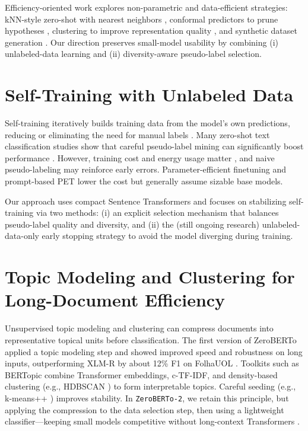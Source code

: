 \documentclass[]{politex-xico}
\begin{document}
Efficiency-oriented work explores non-parametric and data-efficient strategies: kNN-style zero-shot with nearest neighbors \cite{shi2022nearest,shi2022knnprompt}, conformal predictors to prune hypotheses \cite{choubey2022conformal}, clustering to improve representation quality \cite{fei2022beyond}, and synthetic dataset generation \cite{ye2022zerogen}. Our direction preserves small-model usability by combining (i) unlabeled-data learning and (ii) diversity-aware pseudo-label selection.

\section{Self-Training with Unlabeled Data}
\label{sec:self_training}

Self-training iteratively builds training data from the model’s own predictions, reducing or eliminating the need for manual labels \cite{Ando2005}. Many zero-shot text classification studies show that careful pseudo-label mining can significantly boost performance \cite{gera2022zero,van2022don}. However, training cost and energy usage matter \cite{strubell2019energy}, and naive pseudo-labeling may reinforce early errors. Parameter-efficient finetuning \cite{liu2022few} and prompt-based PET \cite{schick2021exploiting} lower the cost but generally assume sizable base models.

Our approach uses compact Sentence Transformers and focuses on stabilizing self-training via two methods: (i) an explicit selection mechanism that balances pseudo-label quality and diversity, and (ii) the (still ongoing research) unlabeled-data-only early stopping strategy to avoid the model diverging during training.

\section{Topic Modeling and Clustering for Long-Document Efficiency}
\label{sec:topics_clustering}

Unsupervised topic modeling and clustering can compress documents into representative topical units before classification. The first version of ZeroBERTo applied a topic modeling step and showed improved speed and robustness on long inputs, outperforming XLM-R by about 12\% F1 on FolhaUOL \cite{alcoforado2022zeroberto}. Toolkits such as BERTopic \cite{grootendorst2020bertopic} combine Transformer embeddings, c-TF-IDF, and density-based clustering (e.g., HDBSCAN \cite{mcinnes2017hdbscan,campello2013hdbscan}) to form interpretable topics. Careful seeding (e.g., k-means++ \cite{arthur2006k}) improves stability. In \texttt{ZeroBERTo-2}, we retain this principle, but applying the compression to the data selection step, then using a lightweight classifier—keeping small models competitive without long-context Transformers \cite{beltagy2020longformer,Zaheer2020BigBT}.
\end{document}
